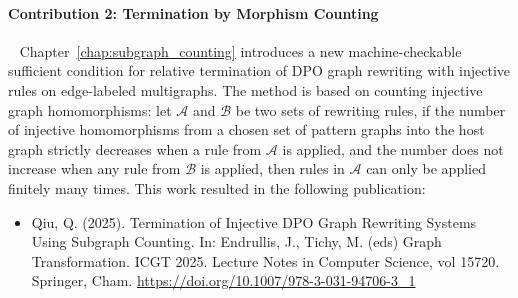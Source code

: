 \paragraph{Contribution 2: Termination by Morphism Counting}
\ \newline
Chapter~\ref{chap:subgraph_counting} introduces a new machine-checkable sufficient condition for relative termination of DPO graph rewriting with injective rules on edge-labeled multigraphs. The method is based on counting injective graph homomorphisms: let $\mathcal{A}$ and $\mathcal{B}$ be two sets of rewriting rules, if the number of injective homomorphisms from a chosen set of pattern graphs into the host graph strictly decreases when a rule from $\mathcal{A}$ is applied, and the number does not increase when any rule from $\mathcal{B}$ is applied, then rules in $\mathcal{A}$ can only be applied finitely many times.
This work resulted in the following publication:
\begin{itemize}
    \item Qiu, Q. (2025). Termination of Injective DPO Graph Rewriting Systems Using Subgraph Counting. In: Endrullis, J., Tichy, M. (eds) Graph Transformation. ICGT 2025. Lecture Notes in Computer Science, vol 15720. Springer, Cham. \url{https://doi.org/10.1007/978-3-031-94706-3_1}
\end{itemize}

